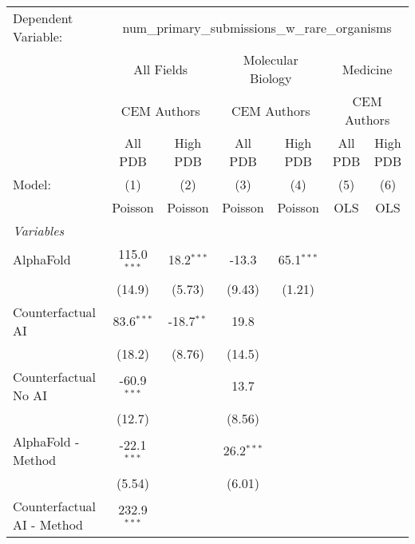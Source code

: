 \begingroup
\centering
\begin{tabular}{lcccccc}
   \tabularnewline \midrule \midrule
   Dependent Variable: & \multicolumn{6}{c}{num\_primary\_submissions\_w\_rare\_organisms}\\
 & \multicolumn{2}{c}{All Fields} & \multicolumn{2}{c}{Molecular Biology} & \multicolumn{2}{c}{Medicine} \\
\cmidrule(lr){2-3} \cmidrule(lr){4-5} \cmidrule(lr){6-7}
 & \multicolumn{2}{c}{CEM Authors} & \multicolumn{2}{c}{CEM Authors} & \multicolumn{2}{c}{CEM Authors} \\
\cmidrule(lr){2-3} \cmidrule(lr){4-5} \cmidrule(lr){6-7}
 & \multicolumn{1}{c}{All PDB} & \multicolumn{1}{c}{High PDB} & \multicolumn{1}{c}{All PDB} & \multicolumn{1}{c}{High PDB} & \multicolumn{1}{c}{All PDB} & \multicolumn{1}{c}{High PDB} \\
\cmidrule(lr){2-2} \cmidrule(lr){3-3} \cmidrule(lr){4-4} \cmidrule(lr){5-5} \cmidrule(lr){6-6} \cmidrule(lr){7-7}
   Model:                     & (1)           & (2)          & (3)          & (4)          & (5)  & (6)\\  
                              &  Poisson      & Poisson      & Poisson      & Poisson      & OLS  & OLS\\  
   \midrule
   \emph{Variables}\\
   AlphaFold                  & 115.0$^{***}$ & 18.2$^{***}$ & -13.3        & 65.1$^{***}$ &      &   \\   
                              & (14.9)        & (5.73)       & (9.43)       & (1.21)       &      &   \\   
   Counterfactual AI          & 83.6$^{***}$  & -18.7$^{**}$ & 19.8         &              &      &   \\   
                              & (18.2)        & (8.76)       & (14.5)       &              &      &   \\   
   Counterfactual No AI       & -60.9$^{***}$ &              & 13.7         &              &      &   \\   
                              & (12.7)        &              & (8.56)       &              &      &   \\   
   AlphaFold - Method         & -22.1$^{***}$ &              & 26.2$^{***}$ &              &      &   \\   
                              & (5.54)        &              & (6.01)       &              &      &   \\   
   Counterfactual AI - Method & 232.9$^{***}$ &              &              &              &      &   \\   

\end{tabular}
